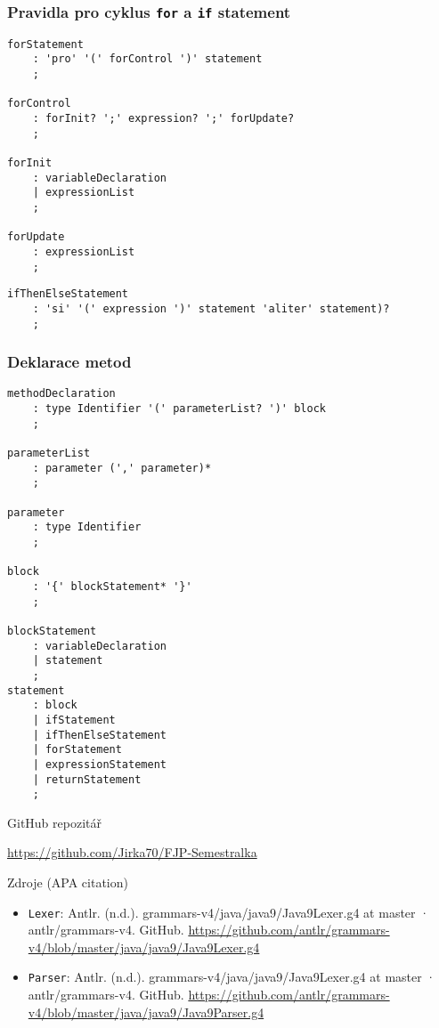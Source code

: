 \documentclass[11pt]{beamer}
\begin{document}
\begin{frame}[fragile]
\frametitle{Pravidla pro cyklus \texttt{for} a \texttt{if} statement}
\begin{lstlisting}
forStatement
    : 'pro' '(' forControl ')' statement
    ;

forControl
    : forInit? ';' expression? ';' forUpdate?
    ;

forInit
    : variableDeclaration
    | expressionList
    ;

forUpdate 
    : expressionList
    ;
\end{lstlisting}
\begin{lstlisting}
ifThenElseStatement
    : 'si' '(' expression ')' statement 'aliter' statement)?
    ;
\end{lstlisting}
\end{frame}

\begin{frame}[fragile]
\frametitle{Deklarace metod}
\vspace{-.26cm}
\begin{lstlisting}
methodDeclaration
    : type Identifier '(' parameterList? ')' block
    ;

parameterList
    : parameter (',' parameter)*
    ;

parameter
    : type Identifier
    ;

block
    : '{' blockStatement* '}'
    ;

blockStatement
    : variableDeclaration
    | statement
    ;
statement
    : block
    | ifStatement
    | ifThenElseStatement
    | forStatement
    | expressionStatement
    | returnStatement
    ;
\end{lstlisting}
\end{frame}
\begin{frame}{GitHub repozitář}
    \item \url{https://github.com/Jirka70/FJP-Semestralka}
\end{frame}
\begin{frame}{Zdroje (APA citation)}
\begin{itemize}
	\item \texttt{Lexer}: Antlr. (n.d.). grammars-v4/java/java9/Java9Lexer.g4 at master · antlr/grammars-v4. GitHub. \url{https://github.com/antlr/grammars-v4/blob/master/java/java9/Java9Lexer.g4}
	\item \texttt{Parser}:
	Antlr. (n.d.). grammars-v4/java/java9/Java9Lexer.g4 at master · antlr/grammars-v4. GitHub. \url{https://github.com/antlr/grammars-v4/blob/master/java/java9/Java9Parser.g4}
\end{itemize}
\end{frame}
\end{document}

